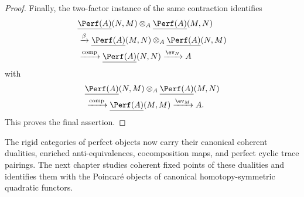 \begin{proof}
Finally, the two-factor instance of the same contraction identifies
\[
\begin{aligned}
    &
    \underline{\Perf(A)}(N,M)
    \otimes_A
    \underline{\Perf(A)}(M,N)
    \\
    &\xrightarrow{\beta}
    \underline{\Perf(A)}(M,N)
    \otimes_A
    \underline{\Perf(A)}(N,M)
    \\
    &\xrightarrow{\mathrm{comp}}
    \underline{\Perf(A)}(N,N)
    \xrightarrow{\ev_N}
    A
\end{aligned}
\]
with
\[
\begin{aligned}
    &
    \underline{\Perf(A)}(N,M)
    \otimes_A
    \underline{\Perf(A)}(M,N)
    \\
    &\xrightarrow{\mathrm{comp}}
    \underline{\Perf(A)}(M,M)
    \xrightarrow{\ev_M}
    A.
\end{aligned}
\]
This proves the final assertion.
\end{proof}



The rigid categories of perfect objects now carry their canonical coherent
dualities, enriched anti-equivalences, cocomposition maps, and perfect
cyclic trace pairings. The next chapter studies coherent fixed points of
these dualities and identifies them with the Poincar\'e objects of canonical
homotopy-symmetric quadratic functors.
